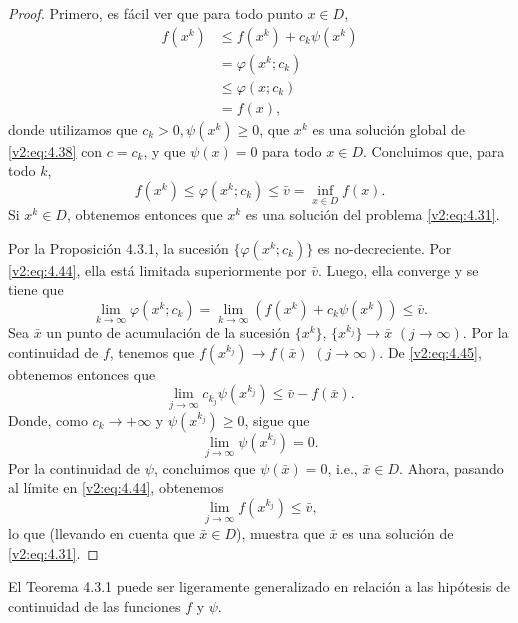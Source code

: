 \begin{proof}
    Primero, es fácil ver que para todo punto $x \in D$,
    \begin{align*}
        f(x^k) &\le f(x^k) + c_k\psi(x^k) \\
        &= \varphi(x^k; c_k) \\
        &\le \varphi(x; c_k) \\
        &= f(x),
    \end{align*}
    donde utilizamos que $c_k > 0, \psi(x^k) \ge 0$, que $x^k$ es una solución global de \eqref{v2:eq:4.38} con $c = c_k$, y que $\psi(x) = 0$ para todo $x \in D$. Concluimos que, para todo $k$,
    \begin{equation}
        f(x^k) \le \varphi(x^k; c_k) \le \bar{v} = \inf_{x \in D} f(x).
        \label{v2:eq:4.44}
    \end{equation}
    Si $x^k \in D$, obtenemos entonces que $x^k$ es una solución del problema \eqref{v2:eq:4.31}.

    Por la Proposición 4.3.1, la sucesión $\{\varphi(x^k; c_k)\}$ es no-decreciente. Por \eqref{v2:eq:4.44}, ella está limitada superiormente por $\bar{v}$. Luego, ella converge y se tiene que
    \begin{equation}
        \lim_{k \to \infty} \varphi(x^k; c_k) = \lim_{k \to \infty} (f(x^k) + c_k\psi(x^k)) \le \bar{v}.
        \label{v2:eq:4.45}
    \end{equation}
    Sea $\bar{x}$ un punto de acumulación de la sucesión $\{x^k\}$, $\{x^{k_j}\} \to \bar{x}$ $(j \to \infty)$. Por la continuidad de $f$, tenemos que $f(x^{k_j}) \to f(\bar{x})$ $(j \to \infty)$. De \eqref{v2:eq:4.45}, obtenemos entonces que
    \[
        \lim_{j \to \infty} c_{k_j}\psi(x^{k_j}) \le \bar{v} - f(\bar{x}).
    \]
    Donde, como $c_k \to +\infty$ y $\psi(x^{k_j}) \ge 0$, sigue que
    \[
        \lim_{j \to \infty} \psi(x^{k_j}) = 0.
    \]
    Por la continuidad de $\psi$, concluimos que $\psi(\bar{x}) = 0$, i.e., $\bar{x} \in D$.
    Ahora, pasando al límite en \eqref{v2:eq:4.44}, obtenemos
    \[
        \lim_{j \to \infty} f(x^{k_j}) \le \bar{v},
    \]
    lo que (llevando en cuenta que $\bar{x} \in D$), muestra que $\bar{x}$ es una solución de \eqref{v2:eq:4.31}.
\end{proof}

El Teorema 4.3.1 puede ser ligeramente generalizado en relación a las hipótesis de continuidad de las funciones $f$ y $\psi$.


